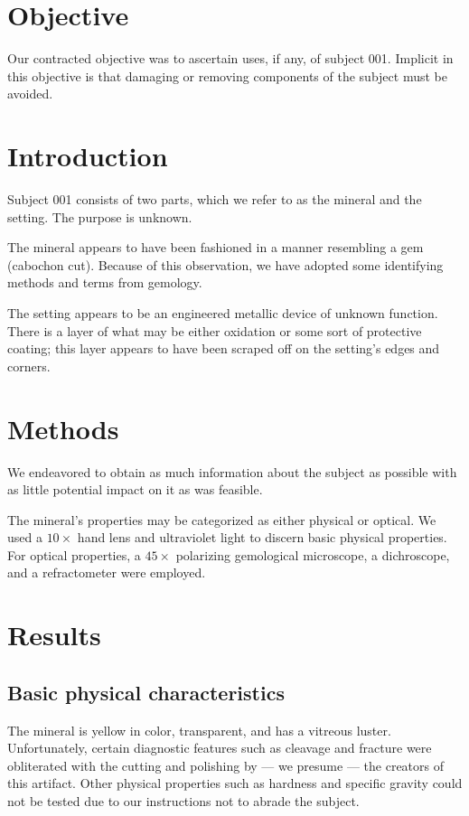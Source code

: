 \documentclass[10pt]{article}
\begin{document}
\maketitle


\section{Objective}
Our contracted objective was to ascertain uses, if any, of subject 001.
Implicit in this objective is that damaging or removing components of the subject must be avoided.

\section{Introduction}

Subject 001 consists of two parts, which we refer to as the mineral and the setting.
The purpose is unknown.

The mineral appears to have been fashioned in a manner resembling a gem (cabochon cut).
Because of this observation, we have adopted some identifying methods and terms from gemology.

The setting appears to be an engineered metallic device of unknown function.
There is a layer of what may be either oxidation or some sort of protective coating; this layer appears to have been scraped off on the setting's edges and corners.

\section{Methods}
We endeavored to obtain as much information about the subject as possible with as little potential impact on it as was feasible.

The mineral's properties may be categorized as either physical or optical.
We used a $10\times$ hand lens and ultraviolet light to discern basic physical properties.
For optical properties, a $45\times$ polarizing gemological microscope, a dichroscope, and a refractometer were employed.

\section{Results}

\subsection{Basic physical characteristics}
The mineral is yellow in color, transparent, and has a vitreous luster.
Unfortunately, certain diagnostic features such as cleavage and fracture were obliterated with the cutting and polishing by --- we presume --- the creators of this artifact.
Other physical properties such as hardness and specific gravity could not be tested due to our instructions not to abrade the subject.
\end{document}

